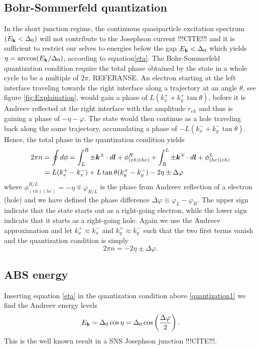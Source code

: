 \subsection{Bohr-Sommerfeld quantization}
In the short junction regime, the continuous quasiparticle excitation spectrum $(E_{\mathbf{k}}<\Delta_0)$ will not contribute to the Josephson current !!!CITE!!! and it is sufficient to restrict our selves to energies below the gap $E_{\mathbf{k}}<\Delta_0$ which yields $\eta = \arccos(E_{\mathbf{k}}/\Delta_0)$, according to equation\eqref{eta}. The Bohr-Sommerfeld quantization condition require the total phase obtained by the state in a whole cycle to be a multiple of $2\pi$. REFERANSE. An electron starting at the left interface traveling towards the right interface along a trajectory at an angle $\theta$, see figure \ref{fig:Explaination}, would gain a phase of $L(k_x^+ + k_y^+\tan\theta)$, before it is Andreev reflected at the right interface with the amplitude $r_{eh}$ and thus is gaining a phase of $-\eta - \varphi$. The state would then continue as a hole traveling back along the same trajectory, accumulating a phase of $-L(k_x^-+ k_y^-\tan\theta)$. Hence, the total phase in the quantization condition yields
\begin{equation}
\begin{split}
    2\pi n &= \oint d\phi = \int_{L}^{R}\pm \boldsymbol{k}^{\pm}\cdot d\boldsymbol{l} + \phi^R_{(eh)(he)} + \int_{R}^{L}\pm \boldsymbol{k}^{\mp}\cdot d\boldsymbol{l} + \phi^L_{(he)(eh)}\\
    &=L(k_x^+-k_x^-)+L\tan\theta(k_y^+-k_y^-) - 2\eta \pm \Delta\varphi
\end{split}
\label{quantization1}
\end{equation}
where $\phi^{R/L}_{(eh)(he)} = -\eta \mp \varphi_{R/L}$ is the phase from Andreev reflection of a electron (hole) and we have defined the phase difference $\Delta\varphi \equiv \varphi_L-\varphi_R$. The upper sign indicate that the state starts out as a right-going electron, while the lower sign indicate that it starts as a right-going hole. Again we use the Andreev approximation and let $k_x^+\approx k_x^-$ and $k_y^+\approx k_y^-$ such that the two first terms vanish and the quantization condition is simply
\begin{equation}
2\pi n = -2\eta \pm \Delta\varphi.
\label{quantization1}
\end{equation}

\subsection{ABS energy}
Inserting equation \eqref{eta} in the quantization condition above \eqref{quantization1} we find the Andreev energy levels
\begin{equation}
    E_{\mathbf{k}} = \Delta_0 \cos \eta = \Delta_0\cos\left(\frac{\Delta\varphi}{2}\right).
\label{AndreevEnergy1}
\end{equation}
This is the well known result in a SNS Josephson junction !!!CITE!!!. 

